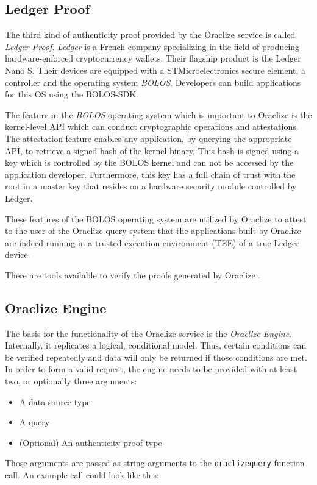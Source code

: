 \subsection*{Ledger Proof}
The third kind of authenticity proof provided by the Oraclize service is called \emph{Ledger Proof}. \emph{Ledger} is a French company specializing in the field of producing hardware-enforced cryptocurrency wallets. Their flagship product is the Ledger Nano S. Their devices are equipped with a STMicroelectronics secure element, a controller and the operating system \emph{BOLOS}. Developers can build applications for this OS using the BOLOS-SDK.

The feature in the \emph{BOLOS} operating system which is important to Oraclize is the kernel-level API which can conduct cryptographic operations and attestations. The attestation feature enables any application, by querying the appropriate API, to retrieve a signed hash of the kernel binary. This hash is signed using a key which is controlled by the BOLOS kernel and can not be accessed by the application developer. Furthermore, this key has a full chain of trust with the root in a master key that resides on a hardware security module controlled by Ledger.

These features of the BOLOS operating system are utilized by Oraclize to attest to the user of the Oraclize query system that the applications built by Oraclize are indeed running in a trusted execution environment (TEE) of a true Ledger device\cite{oraclizedoc}.


There are tools available to verify the proofs generated by Oraclize \cite{oraclizeproofverify}.
\subsection*{Oraclize Engine}
The basis for the functionality of the Oraclize service is the \emph{Oraclize Engine}. Internally, it replicates a logical, conditional model. Thus, certain conditions can be verified repeatedly and data will only be returned if those conditions are met. In order to form a valid request, the engine needs to be provided with at least two, or optionally three arguments:
\begin{itemize}
	\item A data source type
	\item A query
	\item (Optional) An authenticity proof type
\end{itemize} 
Those arguments are passed as string arguments to the \texttt{oraclize\textunderscore query} function call. An example call could look like this:

